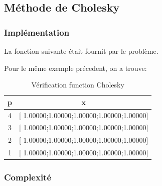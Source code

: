 \documentclass[a4paper,11pt]{article}
\begin{document}



\newpage
\subsection{Méthode de Cholesky}
\subsubsection{Implémentation}

La fonction suivante était fournit par le problème. 
\begin{multicols}{2}
  
\end{multicols}

Pour le même exemple précedent, on a trouve:

\begin{table}[h!]
  \begin{center}
    \begin{tabular}{|c|c|}
      \hline 
      p & x \\
      \hline 
      \hline 
      4 & [ 1.00000;1.00000;1.00000;1.00000;1.00000]\\
      3 & [ 1.00000;1.00000;1.00000;1.00000;1.00000]\\
      2 & [ 1.00000;1.00000;1.00000;1.00000;1.00000]\\
      1 & [ 1.00000;1.00000;1.00000;1.00000;1.00000]\\
      \hline 
    \end{tabular}
  \end{center}
  \caption{Vérification function Cholesky}
\end{table}

\subsubsection{Complexité}
\end{document}
